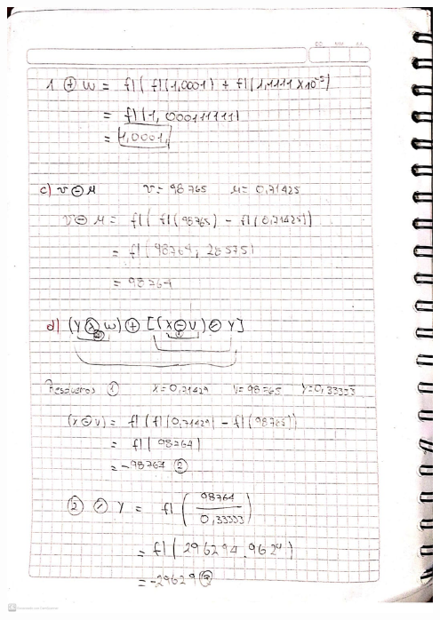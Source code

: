 \documentclass[12pt]{article}
\begin{document}
\vspace{0.5cm}
\begin{minipage}{0.95\textwidth}
    \raggedleft
    \includegraphics[width=0.95\textwidth]{inFiles/Figures/ej2.jpeg}
\end{minipage}
\end{document}
